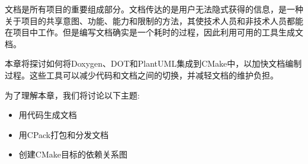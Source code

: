 文档是所有项目的重要组成部分。文档传达的是用户无法隐式获得的信息，是一种关于项目的共享意图、功能、能力和限制的方法，其使技术人员和非技术人员都能在项目中工作。但是编写文档确实是一个耗时的过程，因此利用可用的工具生成文档。

本章将探讨如何将Doxygen、DOT和PlantUML集成到CMake中，以加快文档编制过程。这些工具可以减少代码和文档之间的切换，并减轻文档的维护负担。

为了理解本章，我们将讨论以下主题:

\begin{itemize}
\item 
用代码生成文档

\item 
用CPack打包和分发文档

\item 
创建CMake目标的依赖关系图
\end{itemize}







